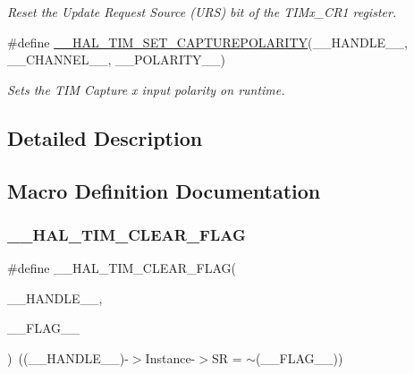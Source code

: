 \begin{DoxyCompactItemize}
\begin{DoxyCompactList}\small\item\em Reset the Update Request Source (U\+RS) bit of the T\+I\+Mx\+\_\+\+C\+R1 register. \end{DoxyCompactList}\item 
\#define \hyperlink{group___t_i_m___exported___macros_gac5d6989516caa67fae23a9329228cdc7}{\+\_\+\+\_\+\+H\+A\+L\+\_\+\+T\+I\+M\+\_\+\+S\+E\+T\+\_\+\+C\+A\+P\+T\+U\+R\+E\+P\+O\+L\+A\+R\+I\+TY}(\+\_\+\+\_\+\+H\+A\+N\+D\+L\+E\+\_\+\+\_\+,  \+\_\+\+\_\+\+C\+H\+A\+N\+N\+E\+L\+\_\+\+\_\+,  \+\_\+\+\_\+\+P\+O\+L\+A\+R\+I\+T\+Y\+\_\+\+\_\+)
\begin{DoxyCompactList}\small\item\em Sets the T\+IM Capture x input polarity on runtime. \end{DoxyCompactList}\end{DoxyCompactItemize}


\subsection{Detailed Description}


\subsection{Macro Definition Documentation}
\mbox{\label{group___t_i_m___exported___macros_ga2fe74db6b8cb4badd04ed48e0f5ac7b4}} 
\subsubsection{\texorpdfstring{\+\_\+\+\_\+\+H\+A\+L\+\_\+\+T\+I\+M\+\_\+\+C\+L\+E\+A\+R\+\_\+\+F\+L\+AG}{\_\_HAL\_TIM\_CLEAR\_FLAG}}
{\footnotesize\ttfamily \#define \+\_\+\+\_\+\+H\+A\+L\+\_\+\+T\+I\+M\+\_\+\+C\+L\+E\+A\+R\+\_\+\+F\+L\+AG(\begin{DoxyParamCaption}\item[{}]{\+\_\+\+\_\+\+H\+A\+N\+D\+L\+E\+\_\+\+\_\+,  }\item[{}]{\+\_\+\+\_\+\+F\+L\+A\+G\+\_\+\+\_\+ }\end{DoxyParamCaption})~((\+\_\+\+\_\+\+H\+A\+N\+D\+L\+E\+\_\+\+\_\+)-\/$>$Instance-\/$>$SR = $\sim$(\+\_\+\+\_\+\+F\+L\+A\+G\+\_\+\+\_\+))}




